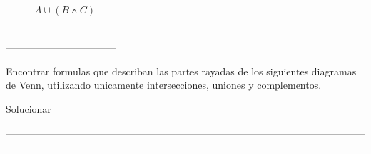 \documentclass[10pt]{article}
\begin{document}
\begin{ej}
\begin{itemize}
\begin{figure}[H]
\begin{minipage}[b]{0.4\linewidth}
	
	
	$A \cup (B \vartriangle C)$	
	\end{minipage}
\end{figure}
\end{itemize}
\end{ej}
---------------------------------------------------------------------------------------------------------------------------------------------
\begin{ej}
	Encontrar formulas que describan las partes rayadas de los siguientes diagramas de Venn, utilizando
	unicamente intersecciones, uniones y complementos.
	
	\textcolor{R}{Solucionar}
\end{ej}
---------------------------------------------------------------------------------------------------------------------------------------------
\end{document}
